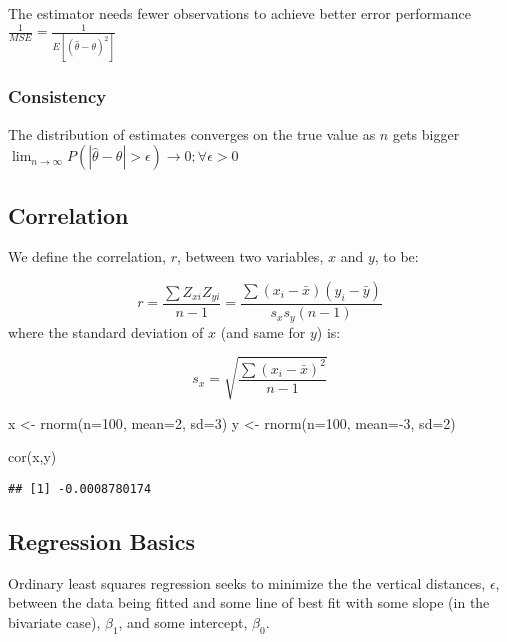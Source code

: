 \documentclass[
]{article}
\newenvironment{Shaded}{\begin{snugshade}}{\end{snugshade}}
\newcommand{\AttributeTok}[1]{\textcolor[rgb]{0.77,0.63,0.00}{#1}}
\newcommand{\DecValTok}[1]{\textcolor[rgb]{0.00,0.00,0.81}{#1}}
\newcommand{\FunctionTok}[1]{\textcolor[rgb]{0.00,0.00,0.00}{#1}}
\newcommand{\NormalTok}[1]{#1}
\newcommand{\OtherTok}[1]{\textcolor[rgb]{0.56,0.35,0.01}{#1}}
\newcommand{\SpecialCharTok}[1]{\textcolor[rgb]{0.00,0.00,0.00}{#1}}
\begin{document}
The estimator needs fewer observations to achieve better error
performance \(\frac{1}{MSE}=\frac{1}{E[(\hat{\theta}-\theta)^2]}\)

\hypertarget{consistency}{%
\subsubsection{Consistency}\label{consistency}}

The distribution of estimates converges on the true value as \(n\) gets
bigger
\(\lim_{n\to\infty} P(|\hat{\theta} - \theta| > \epsilon) \to 0; \forall\epsilon >0\)

\hypertarget{correlation}{%
\subsection{Correlation}\label{correlation}}

We define the correlation, \(r\), between two variables, \(x\) and
\(y\), to be:

\[r=\frac{\sum{Z_{xi}Z_{yi}}}{n-1}=\frac{\sum{(x_i-\bar{x})(y_i-\bar{y})}}{s_xs_y(n-1)}\]
where the standard deviation of \(x\) (and same for \(y\)) is:

\[s_x=\sqrt{\frac{\sum{(x_i-\bar{x})^2}}{n-1}}\]

\begin{Shaded}
\begin{Highlighting}[]
\NormalTok{x }\OtherTok{\textless{}{-}} \FunctionTok{rnorm}\NormalTok{(}\AttributeTok{n=}\DecValTok{100}\NormalTok{, }\AttributeTok{mean=}\DecValTok{2}\NormalTok{, }\AttributeTok{sd=}\DecValTok{3}\NormalTok{)}
\NormalTok{y }\OtherTok{\textless{}{-}} \FunctionTok{rnorm}\NormalTok{(}\AttributeTok{n=}\DecValTok{100}\NormalTok{, }\AttributeTok{mean=}\SpecialCharTok{{-}}\DecValTok{3}\NormalTok{, }\AttributeTok{sd=}\DecValTok{2}\NormalTok{)}

\FunctionTok{cor}\NormalTok{(x,y)}
\end{Highlighting}
\end{Shaded}

\begin{verbatim}
## [1] -0.0008780174
\end{verbatim}

\hypertarget{regression-basics}{%
\subsection{Regression Basics}\label{regression-basics}}

Ordinary least squares regression seeks to minimize the the vertical
distances, \(\epsilon\), between the data being fitted and some line of
best fit with some slope (in the bivariate case), \(\beta_1\), and some
intercept, \(\beta_0\).
\end{document}
